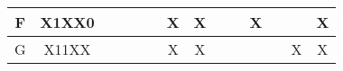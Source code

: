 \documentclass[12pt,a4paper]{report}
\begin{document}
\begin{tabular}{|c|c|c|c|c|c|c|c|c|c|c|c|c|c|}
    \rowcolor[HTML]{FFFFC7} 
    \cellcolor[HTML]{FFCCC9}F & \cellcolor[HTML]{FFCCC9}X1XX0 &                                                                                   &                                                                                   &                                                                                   & \cellcolor[HTML]{FFCCC9}                                  & X                                                                                 & X                                                                                 &                                                                                   &                                                                                   & X                                                                                 &                                                                                   &                                                                                   & X                                                                                 \\ \hline
    \rowcolor[HTML]{FFFFC7} 
    \cellcolor[HTML]{FFCCC9}G & \cellcolor[HTML]{FFCCC9}X11XX &                                                                                   &                                                                                   &                                                                                   & \cellcolor[HTML]{FFCCC9}                                  & X                                                                                 & X                                                                                 &                                                                                   &                                                                                   &                                                                                   &                                                                                   & X                                                                                 & X                                                                                 \\ \hline

\end{tabular}
\end{document}
